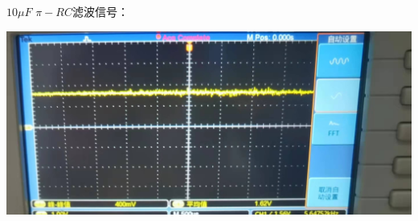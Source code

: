 \documentclass[a4paper]{ltxdoc}
\newenvironment{Figure}
{\par\medskip\noindent\minipage{\linewidth}}
{\endminipage\par\medskip}
\begin{document}
\begin{multicols}{2}
    $10\mu F$ $\pi - RC$滤波信号：
    \begin{Figure}
        \centering
        \includegraphics[width=0.7\linewidth]{img/original/6.jpg}
    \end{Figure}
\end{multicols}
\end{document}
